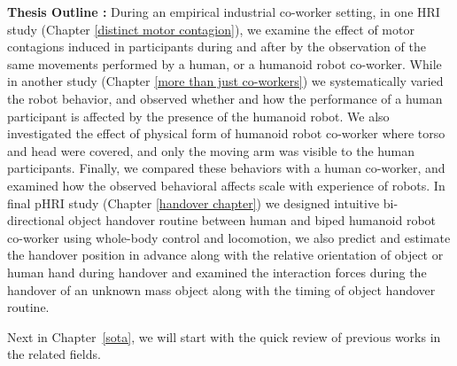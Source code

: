 \textbf{Thesis Outline :} During an empirical industrial co-worker setting, in one HRI study (Chapter \ref{distinct motor contagion}), we examine the effect of motor contagions induced in participants during and after by the observation of the same movements performed by a human, or a humanoid robot co-worker. While in  another study (Chapter \ref{more than just co-workers}) we systematically varied the robot behavior, and observed whether and how the performance of a human participant is affected by the presence of the humanoid robot. We also investigated the effect of physical form of humanoid robot co-worker where torso and head were covered, and only the moving arm was visible to the human participants. Finally, we compared these behaviors with a human co-worker, and examined how the observed behavioral affects scale with experience of robots. In final pHRI study (Chapter \ref{handover chapter}) we designed intuitive bi-directional object handover routine between human and biped humanoid robot co-worker using whole-body control and locomotion, we also predict and estimate the handover position in advance along with the relative orientation of object or human hand during handover and examined the interaction forces during the handover of an unknown mass object along with the timing of object handover routine.

Next in Chapter~\ref{sota}, we will start with the quick review of previous works in the related fields.



\clearpage %





